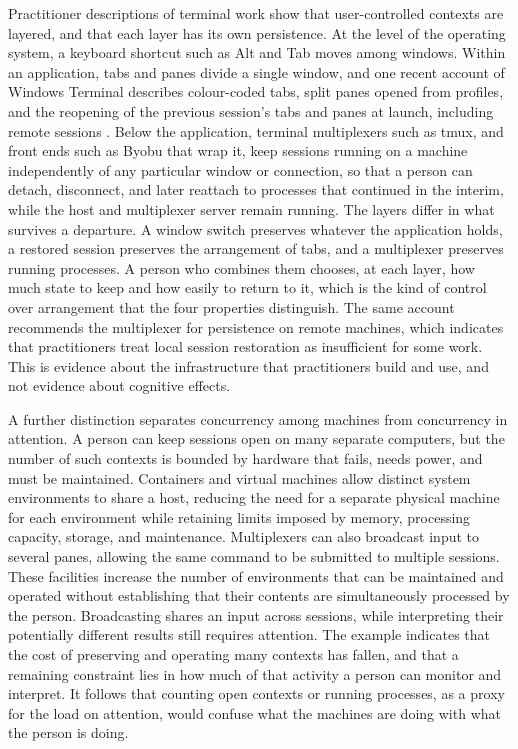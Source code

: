 \documentclass[12pt]{article}
\begin{document}
Practitioner descriptions of terminal work show that user-controlled contexts are layered, and that each layer has its own persistence. At the level of the operating system, a keyboard shortcut such as Alt and Tab moves among windows. Within an application, tabs and panes divide a single window, and one recent account of Windows Terminal describes colour-coded tabs, split panes opened from profiles, and the reopening of the previous session's tabs and panes at launch, including remote sessions \cite{sherback2026terminal}. Below the application, terminal multiplexers such as tmux, and front ends such as Byobu that wrap it, keep sessions running on a machine independently of any particular window or connection, so that a person can detach, disconnect, and later reattach to processes that continued in the interim, while the host and multiplexer server remain running. The layers differ in what survives a departure. A window switch preserves whatever the application holds, a restored session preserves the arrangement of tabs, and a multiplexer preserves running processes. A person who combines them chooses, at each layer, how much state to keep and how easily to return to it, which is the kind of control over arrangement that the four properties distinguish. The same account recommends the multiplexer for persistence on remote machines, which indicates that practitioners treat local session restoration as insufficient for some work. This is evidence about the infrastructure that practitioners build and use, and not evidence about cognitive effects.

A further distinction separates concurrency among machines from concurrency in attention. A person can keep sessions open on many separate computers, but the number of such contexts is bounded by hardware that fails, needs power, and must be maintained. Containers and virtual machines allow distinct system environments to share a host, reducing the need for a separate physical machine for each environment while retaining limits imposed by memory, processing capacity, storage, and maintenance. Multiplexers can also broadcast input to several panes, allowing the same command to be submitted to multiple sessions. These facilities increase the number of environments that can be maintained and operated without establishing that their contents are simultaneously processed by the person. Broadcasting shares an input across sessions, while interpreting their potentially different results still requires attention. The example indicates that the cost of preserving and operating many contexts has fallen, and that a remaining constraint lies in how much of that activity a person can monitor and interpret. It follows that counting open contexts or running processes, as a proxy for the load on attention, would confuse what the machines are doing with what the person is doing.
\end{document}

